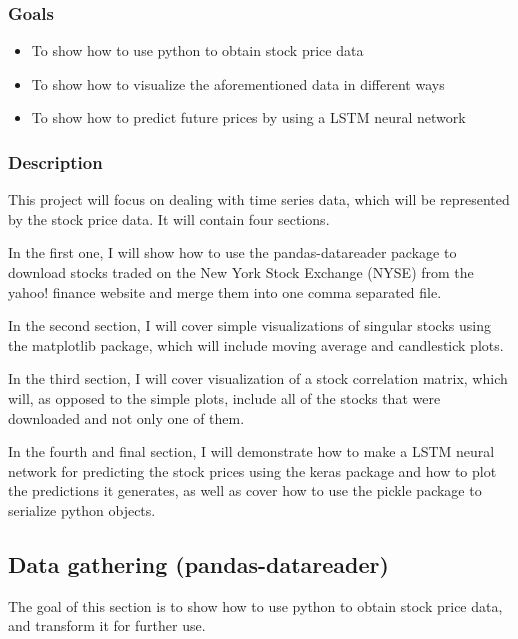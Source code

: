 \documentclass[12pt, a4paper]{article}
\begin{document}
\subsubsection{Goals}

\begin{itemize}
	\item To show how to use python to obtain stock price data
	\item To show how to visualize the aforementioned data in different ways
	\item To show how to predict future prices by using a LSTM neural network
\end{itemize}

\subsubsection{Description}

This project will focus on dealing with time series data, which will be represented by the stock price data. It will contain four sections.

In the first one, I will show how to use the pandas-datareader package to download stocks traded on the New York Stock Exchange (NYSE) from the yahoo! finance website and merge them into one comma separated file.

In the second section, I will cover simple visualizations of singular stocks using the matplotlib package, which will include moving average and candlestick plots.

In the third section, I will cover visualization of a stock correlation matrix, which will, as opposed to the simple plots, include all of the stocks that were downloaded and not only one of them.

In the fourth and final section, I will demonstrate how to make a LSTM neural network for predicting the stock prices using the keras package and how to plot the predictions it generates, as well as cover how to use the pickle package to serialize python objects.


\newpage
\subsection{Data gathering (pandas-datareader)}


The goal of this section is to show how to use python to obtain stock price data, and transform it for further use.
\end{document}

